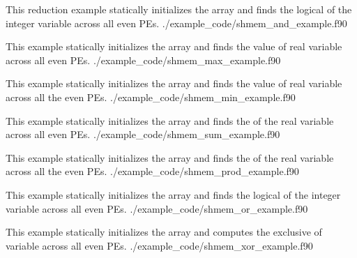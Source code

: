 \begin{apidefinition}


\begin{apiexamples}

\apifexample
    {This \Fortran reduction example statically initializes the  array
    and finds the logical  of the integer variable  across all
    even \acp{PE}.}
    {./example_code/shmem_and_example.f90}
    {}
    
\apifexample
    {This \Fortran example statically initializes the  array and finds
    the  value of real variable  across all even \acp{PE}.}
    {./example_code/shmem_max_example.f90}
    {}

\apifexample
    { This \Fortran example statically initializes the  array and finds
    the  value of real variable  across all the even
    \acp{PE}.}
    {./example_code/shmem_min_example.f90}
    {}

\apifexample
    {This \Fortran example statically initializes the  array and finds
    the  of the real variable  across all even \acp{PE}.}
    {./example_code/shmem_sum_example.f90}
    {}

\apifexample
    {This \Fortran example statically initializes the  array and finds
    the  of the real variable  across all the even \acp{PE}.}
    {./example_code/shmem_prod_example.f90}
    {}

\apifexample
    {This \Fortran example statically initializes the  array and finds
    the logical  of the integer variable  across all even
    \acp{PE}.}
    {./example_code/shmem_or_example.f90}
    {}

\apifexample
    {This \Fortran example statically initializes the  array and
    computes the exclusive  of variable  across all even
    \acp{PE}.}
    {./example_code/shmem_xor_example.f90}
    {} 

\end{apiexamples}

\end{apidefinition}

